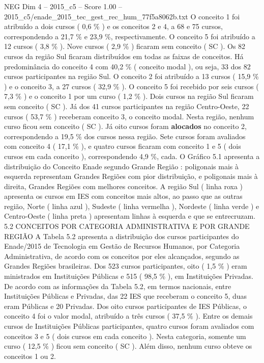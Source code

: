 \begin{textsample}{NEG Dim 4 – 2015\_c5 – Score 1.00 – 2015\_c5/enade\_2015\_tec\_gest\_rec\_hum\_77f5a8062b.txt}
O conceito 1 foi atribuído a dois cursos ( 0,6 \% ) e os conceitos 2 e 4, a 68 e 75 cursos, correspondendo a 21,7 \% e 23,9 \%, respectivamente.
O conceito 5 foi atribuído a 12 cursos ( 3,8 \% ).
Nove cursos ( 2,9 \% ) ficaram sem conceito ( SC ).
Os 82 cursos da região Sul ficaram distribuídos em todas as faixas de conceitos.
Há predominância do conceito 4 com 40,2 \% ( conceito modal ), ou seja, 33 dos 82 cursos participantes na região Sul.
O conceito 2 foi atribuído a 13 cursos ( 15,9 \% ) e o conceito 3, a 27 cursos ( 32,9 \% ).
O conceito 5 foi recebido por seis cursos ( 7,3 \% ) e o conceito 1 por um curso ( 1,2 \% ).
Dois cursos na região Sul ficaram sem conceito ( SC ).
Já dos 41 cursos participantes na região Centro-Oeste, 22 cursos ( 53,7 \% ) receberam conceito 3, o conceito modal.
Nesta região, nenhum curso ficou sem conceito ( SC ).
Já oito cursos foram \textbf{alocados} no conceito 2, correspondendo a 19,5 \% dos cursos nessa região.
Sete cursos foram avaliados com conceito 4 ( 17,1 \% ), e quatro cursos ficaram com conceito 1 e 5 ( dois cursos em cada conceito ), correspondendo 4,9 \%, cada.
O Gráfico 5.1 apresenta a distribuição do Conceito Enade segundo Grande Região : poligonais mais à esquerda representam Grandes Regiões com pior distribuição, e poligonais mais à direita, Grandes Regiões com melhores conceitos.
A região Sul ( linha roxa ) apresenta os cursos em IES com conceitos mais altos, ao passo que as outras região, Norte ( linha azul ), Sudeste ( linha vermelha ), Nordeste ( linha verde ) e Centro-Oeste ( linha preta ) apresentam linhas à esquerda e que se entrecruzam. 5.2 CONCEITOS POR CATEGORIA ADMINISTRATIVA E POR GRANDE REGIÃO A Tabela 5.2 apresenta a distribuição dos cursos participantes do Enade/2015 de Tecnologia em Gestão de Recursos Humanos, por Categoria Administrativa, de acordo com os conceitos por eles alcançados, segundo as Grandes Regiões brasileiras.
Dos 523 cursos participantes, oito ( 1,5 \% ) eram ministrados em Instituições Públicas e 515 ( 98,5 \% ), em Instituições Privadas.
De acordo com as informações da Tabela 5.2, em termos nacionais, entre Instituições Públicas e Privadas, das 22 IES que receberam o conceito 5, duas eram Públicas e 20 Privadas.
Dos oito cursos participantes de IES Públicas, o conceito 4 foi o valor modal, atribuído a três cursos ( 37,5 \% ).
Entre os demais cursos de Instituições Públicas participantes, quatro cursos foram avaliados com conceitos 3 e 5 ( dois cursos em cada conceito ).
Nesta categoria, somente um curso ( 12,5 \% ) ficou sem conceito ( SC ).
Além disso, nenhum curso obteve os conceitos 1 ou 2.

\end{textsample}
